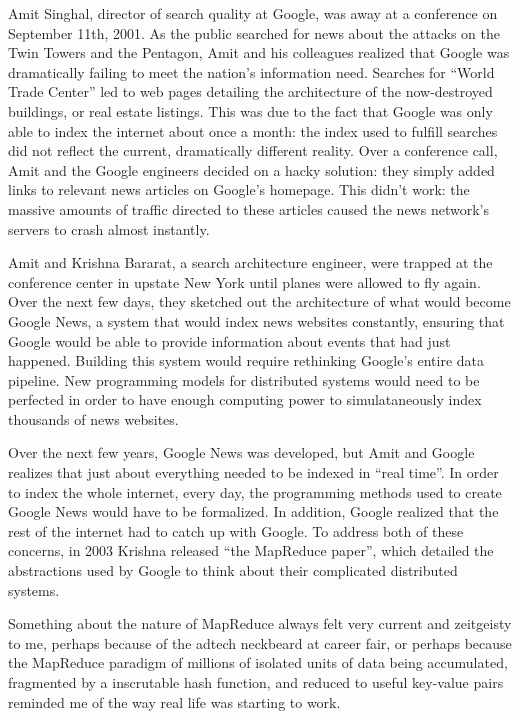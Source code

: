 \documentclass[12pt]{article}
\begin{document}
Amit Singhal, director of search quality at Google, was away at a
conference on September 11th, 2001. As the public searched for news
about the attacks on the Twin Towers and the Pentagon, Amit and his
colleagues realized that Google was dramatically failing to meet the nation's
information need. Searches for ``World Trade Center'' led to web pages
detailing the architecture of the now-destroyed buildings, or real
estate listings.  This was due to the fact that Google was only able to
index the internet about once a month: the index used to fulfill
searches did not reflect the current, dramatically different reality.
Over a conference call, Amit and the Google engineers decided on a hacky
solution: they simply added links to relevant news articles on Google's
homepage.  This didn't work: the massive amounts of traffic directed to
these articles caused the news network's servers to crash almost
instantly.

Amit and Krishna Bararat, a search architecture engineer, were trapped
at the conference center in upstate New York until planes were allowed
to fly again.  Over the next few days, they sketched out the
architecture of what would become Google News, a system that would index
news websites constantly, ensuring that Google would be able to provide
information about events that had just happened.  Building this system
would require rethinking Google's entire data pipeline.  New programming
models for distributed systems would need to be perfected in order to
have enough computing power to simulataneously index thousands of news
websites.

Over the next few years, Google News was developed, but Amit and Google
realizes that just about everything needed to be indexed in ``real time''.
In order to index the whole internet, every day, the programming methods
used to create Google News would have to be formalized.  In addition,
Google realized that the rest of the internet had to catch up with
Google.  To address both of these concerns, in 2003 Krishna released
``the MapReduce paper'', which detailed the abstractions used by Google to
think about their complicated distributed systems.  

Something about the nature of MapReduce always felt very current and
zeitgeisty to me, perhaps because of the adtech neckbeard at career
fair, or perhaps because the MapReduce paradigm of millions of isolated
units of data being accumulated, fragmented by a inscrutable hash
function, and reduced to useful key-value pairs reminded me of the way
real life was starting to work.
\end{document}
